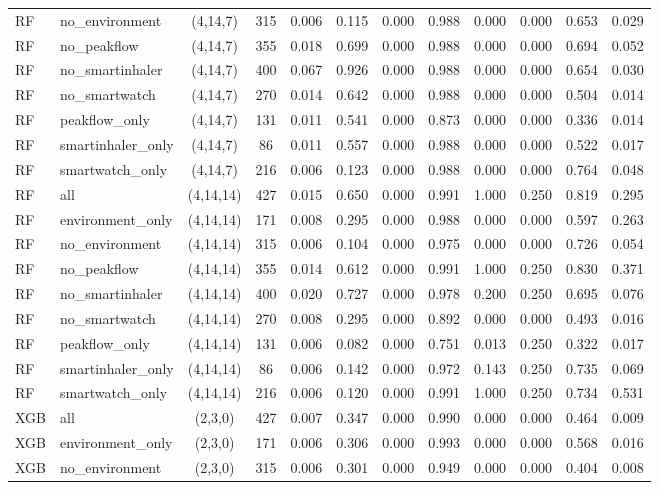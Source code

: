 \begin{longtable}{llcccccccccc}
RF & no\_environment & (4,14,7) & 315 & 0.006 & 0.115 & 0.000 & 0.988 & 0.000 & 0.000 & 0.653 & 0.029 \\
RF & no\_peakflow & (4,14,7) & 355 & 0.018 & 0.699 & 0.000 & 0.988 & 0.000 & 0.000 & 0.694 & 0.052 \\
RF & no\_smartinhaler & (4,14,7) & 400 & 0.067 & 0.926 & 0.000 & 0.988 & 0.000 & 0.000 & 0.654 & 0.030 \\
RF & no\_smartwatch & (4,14,7) & 270 & 0.014 & 0.642 & 0.000 & 0.988 & 0.000 & 0.000 & 0.504 & 0.014 \\
RF & peakflow\_only & (4,14,7) & 131 & 0.011 & 0.541 & 0.000 & 0.873 & 0.000 & 0.000 & 0.336 & 0.014 \\
RF & smartinhaler\_only & (4,14,7) & 86 & 0.011 & 0.557 & 0.000 & 0.988 & 0.000 & 0.000 & 0.522 & 0.017 \\
RF & smartwatch\_only & (4,14,7) & 216 & 0.006 & 0.123 & 0.000 & 0.988 & 0.000 & 0.000 & 0.764 & 0.048 \\
RF & all & (4,14,14) & 427 & 0.015 & 0.650 & 0.000 & 0.991 & 1.000 & 0.250 & 0.819 & 0.295 \\
RF & environment\_only & (4,14,14) & 171 & 0.008 & 0.295 & 0.000 & 0.988 & 0.000 & 0.000 & 0.597 & 0.263 \\
RF & no\_environment & (4,14,14) & 315 & 0.006 & 0.104 & 0.000 & 0.975 & 0.000 & 0.000 & 0.726 & 0.054 \\
RF & no\_peakflow & (4,14,14) & 355 & 0.014 & 0.612 & 0.000 & 0.991 & 1.000 & 0.250 & 0.830 & 0.371 \\
RF & no\_smartinhaler & (4,14,14) & 400 & 0.020 & 0.727 & 0.000 & 0.978 & 0.200 & 0.250 & 0.695 & 0.076 \\
RF & no\_smartwatch & (4,14,14) & 270 & 0.008 & 0.295 & 0.000 & 0.892 & 0.000 & 0.000 & 0.493 & 0.016 \\
RF & peakflow\_only & (4,14,14) & 131 & 0.006 & 0.082 & 0.000 & 0.751 & 0.013 & 0.250 & 0.322 & 0.017 \\
RF & smartinhaler\_only & (4,14,14) & 86 & 0.006 & 0.142 & 0.000 & 0.972 & 0.143 & 0.250 & 0.735 & 0.069 \\
RF & smartwatch\_only & (4,14,14) & 216 & 0.006 & 0.120 & 0.000 & 0.991 & 1.000 & 0.250 & 0.734 & 0.531 \\
XGB & all & (2,3,0) & 427 & 0.007 & 0.347 & 0.000 & 0.990 & 0.000 & 0.000 & 0.464 & 0.009 \\
XGB & environment\_only & (2,3,0) & 171 & 0.006 & 0.306 & 0.000 & 0.993 & 0.000 & 0.000 & 0.568 & 0.016 \\
XGB & no\_environment & (2,3,0) & 315 & 0.006 & 0.301 & 0.000 & 0.949 & 0.000 & 0.000 & 0.404 & 0.008 \\

\end{longtable}
